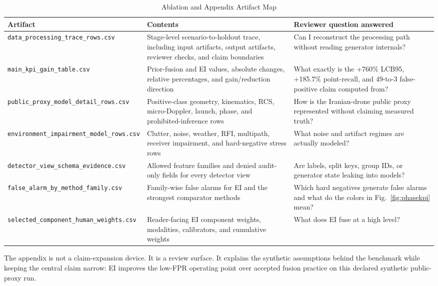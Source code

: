 \begin{table}[t]
  \caption{Ablation and Appendix Artifact Map}
  \label{tab:appendixartifactmap}
  \centering
  \small
  \begin{tabular}{@{}p{}p{}p{}@{}}
    \toprule
    Artifact & Contents & Reviewer question answered \\
    \midrule
    \texttt{data\_processing\_trace\_rows.csv} & Stage-level scenario-to-holdout trace, including input artifacts, output artifacts, reviewer checks, and claim boundaries & Can I reconstruct the processing path without reading generator internals? \\
    \texttt{main\_kpi\_gain\_table.csv} & Prior-fusion and EI values, absolute changes, relative percentages, and gain/reduction direction & What exactly is the +760\% LCB95, +185.7\% point-recall, and 49-to-3 false-positive claim computed from? \\
    \texttt{public\_proxy\_model\_detail\_rows.csv} & Positive-class geometry, kinematics, RCS, micro-Doppler, launch, phase, and prohibited-inference rows & How is the Iranian-drone public proxy represented without claiming measured truth? \\
    \texttt{environment\_impairment\_model\_rows.csv} & Clutter, noise, weather, RFI, multipath, receiver impairment, and hard-negative stress rows & What noise and artifact regimes are actually modeled? \\
    \texttt{detector\_view\_schema\_evidence.csv} & Allowed feature families and denied audit-only fields for every detector view & Are labels, split keys, group IDs, or generator state leaking into models? \\
    \texttt{false\_alarm\_by\_method\_family.csv} & Family-wise false alarms for EI and the strongest comparator methods & Which hard negatives generate false alarms and what do the colors in Fig.~\ref{fig:phasekpi} mean? \\
    \texttt{selected\_component\_human\_weights.csv} & Reader-facing EI component weights, modalities, calibrators, and cumulative weights & What does EI fuse at a high level? \\
    \bottomrule
  \end{tabular}
\end{table}

The appendix is not a claim-expansion device. It is a review surface. It explains the synthetic assumptions behind the benchmark while keeping the central claim narrow: EI improves the low-FPR operating point over accepted fusion practice on this declared synthetic public-proxy run.
